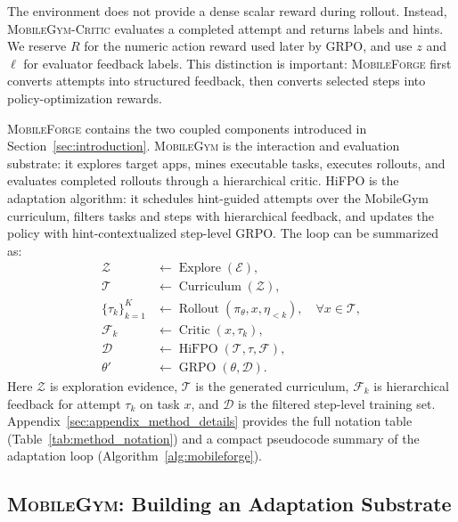 \documentclass{llmxive}
\providecommand{\ourmethod}{\textsc{MobileForge}\xspace}
\providecommand{\mobilegym}{\textsc{MobileGym}\xspace}
\providecommand{\critic}{\textsc{MobileGym-Critic}\xspace}
\providecommand{\hifpo}{HiFPO\xspace}
\begin{document}
The environment does not provide a dense scalar reward during rollout. Instead, \critic evaluates a completed attempt and returns labels and hints. We reserve $R$ for the numeric action reward used later by GRPO, and use $z$ and $\ell$ for evaluator feedback labels. This distinction is important: \ourmethod first converts attempts into structured feedback, then converts selected steps into policy-optimization rewards.

\ourmethod contains the two coupled components introduced in Section~\ref{sec:introduction}. \mobilegym is the interaction and evaluation substrate: it explores target apps, mines executable tasks, executes rollouts, and evaluates completed rollouts through a hierarchical critic. \hifpo is the adaptation algorithm: it schedules hint-guided attempts over the MobileGym curriculum, filters tasks and steps with hierarchical feedback, and updates the policy with hint-contextualized step-level GRPO. The loop can be summarized as:
\begin{equation}
\label{eq:mobileforge-loop}
\begin{aligned}
\mathcal{Z} &\leftarrow \operatorname{Explore}(\mathcal{E}),\\
\mathcal{T} &\leftarrow \operatorname{Curriculum}(\mathcal{Z}),\\
\{\tau_k\}_{k=1}^{K} &\leftarrow
\operatorname{Rollout}(\pi_\theta,x,\eta_{<k}),\quad \forall x\in\mathcal{T},\\
\mathcal{F}_{k} &\leftarrow \operatorname{Critic}(x,\tau_k),\\
\mathcal{D} &\leftarrow \operatorname{HiFPO}(\mathcal{T},\tau,\mathcal{F}),\\
\theta' &\leftarrow \operatorname{GRPO}(\theta,\mathcal{D}).
\end{aligned}
\end{equation}
Here $\mathcal{Z}$ is exploration evidence, $\mathcal{T}$ is the generated curriculum, $\mathcal{F}_{k}$ is hierarchical feedback for attempt $\tau_k$ on task $x$, and $\mathcal{D}$ is the filtered step-level training set. Appendix~\ref{sec:appendix_method_details} provides the full notation table (Table~\ref{tab:method_notation}) and a compact pseudocode summary of the adaptation loop (Algorithm~\ref{alg:mobileforge}).

\subsection{\mobilegym: Building an Adaptation Substrate}
\label{sec:mobilegym}
\end{document}
